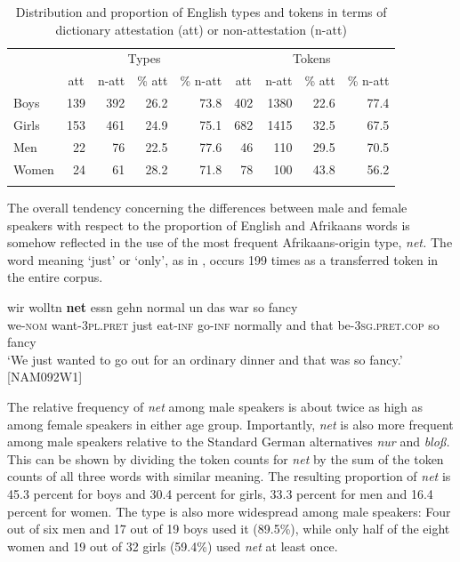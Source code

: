 \documentclass[output=paper]{langsci/langscibook}
\begin{document}
  
\begin{table}
\begin{tabular}{lrrrrrrrr}
\lsptoprule
& \multicolumn{4}{c}{Types} & \multicolumn{4}{c}{Tokens}\\\cmidrule(lr){2-5}\cmidrule(lr){6-9}
& \multicolumn{1}{c}{att} & \multicolumn{1}{c}{n-att} & \multicolumn{1}{c}{\% att} & \multicolumn{1}{c}{\% n-att} & \multicolumn{1}{c}{att} & \multicolumn{1}{c}{n-att} & \multicolumn{1}{c}{\% att} & \multicolumn{1}{c}{\% n-att}\\
\hline
Boys & 139 & 392 & 26.2 & 73.8 & 402 & 1380 & 22.6 & 77.4\\
Girls & 153 & 461 & 24.9 & 75.1 & 682 & 1415 & 32.5 & 67.5\\
Men & 22 & 76 & 22.5 & 77.6 & 46 & 110 & 29.5 & 70.5\\
Women & 24 & 61 & 28.2 & 71.8 & 78 & 100 & 43.8 & 56.2\\
\lspbottomrule
\end{tabular}
\caption{Distribution and proportion of English types and tokens in terms of dictionary attestation (att) or non-attestation (n-att)\label{tab:bracke:8}}
\end{table}  

The overall tendency concerning the differences between male and female speakers with respect to the proportion of English and Afrikaans words is somehow reflected in the use of the most frequent Afrikaans-origin type, \textit{net.} The word meaning ‘just’ or ‘only’, as in , occurs 199 times as a transferred token in the entire corpus.

\ea
\label{ex:bracke:8}
\gll wir wolltn \textbf{net} essn gehn normal un das war so fancy\\
     we-\textsc{nom} want-\textsc{3pl.pret} just eat-\textsc{inf} go-\textsc{inf} normally and that be-\textsc{3sg.pret.cop} so fancy\\
\glt `We just wanted to go out for an ordinary dinner and that was so fancy.' {[}NAM092W1{]}
\z

The relative frequency of \textit{net} among male speakers is about twice as high as among female speakers in either age group. Importantly, \textit{net} is also more frequent among male speakers relative to the Standard German alternatives \textit{nur} and \textit{bloß.} This can be shown by dividing the token counts for \textit{net} by the sum of the token counts of all three words with similar meaning. The resulting proportion of \textit{net} is 45.3 percent for boys and 30.4 percent for girls, 33.3 percent for men and 16.4 percent for women. The type is also more widespread among male speakers: Four out of six men and 17 out of 19 boys used it (89.5\%), while only half of the eight women and 19 out of 32 girls (59.4\%) used \textit{net} at least once.
\end{document}
